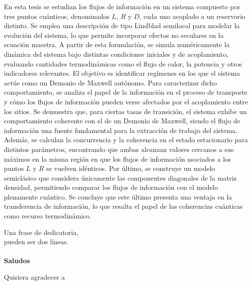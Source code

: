 \documentclass[
	spanish, %
	letterpaper, oneside
]{book}
\begin{document}
\templatePortrait

\templatePagecfg

\begin{abstractd}
En esta tesis se estudian los flujos de información en un sistema compuesto por tres puntos cuánticos, denominados \( L \), \( R \) y \( D \), cada uno acoplado a un reservorio distinto. Se emplea una descripción de tipo Lindblad semilocal para modelar la evolución del sistema, lo que permite incorporar efectos no seculares en la ecuación maestra. A partir de esta formulación, se simula numéricamente la dinámica del sistema bajo distintas condiciones iniciales y de acoplamiento, evaluando cantidades termodinámicas como el flujo de calor, la potencia y otros indicadores relevantes. El objetivo es identificar regímenes en los que el sistema actúe como un Demonio de Maxwell autónomo. Para caracterizar dicho comportamiento, se analiza el papel de la información en el proceso de transporte y cómo los flujos de información pueden verse afectados por el acoplamiento entre los sitios. Se demuestra que, para ciertas tasas de transición, el sistema exhibe un comportamiento coherente con el de un Demonio de Maxwell, siendo el flujo de información una fuente fundamental para la extracción de trabajo del sistema. Además, se calculan la concurrencia y la coherencia en el estado estacionario para distintos parámetros, encontrando que ambas alcanzan valores cercanos a sus máximos en la misma región en que los flujos de información asociados a los puntos \( L \) y \( R \) se vuelven idénticos. Por último, se construye un modelo semiclásico que considera únicamente las componentes diagonales de la matriz densidad, permitiendo comparar los flujos de información con el modelo plenamente cuántico. Se concluye que este último presenta una ventaja en la transferencia de información, lo que resalta el papel de las coherencias cuánticas como recurso termodinámico.
\end{abstractd}


\begin{dedicatory}
	Una frase de dedicatoria, \\
	pueden ser dos líneas. \\
	~ \\
	\textbf{Saludos}
\end{dedicatory}

\begin{acknowledgments}
	Quisiera agradecer a 
\end{acknowledgments}

\templateIndex

\templateFinalcfg



\end{document}
